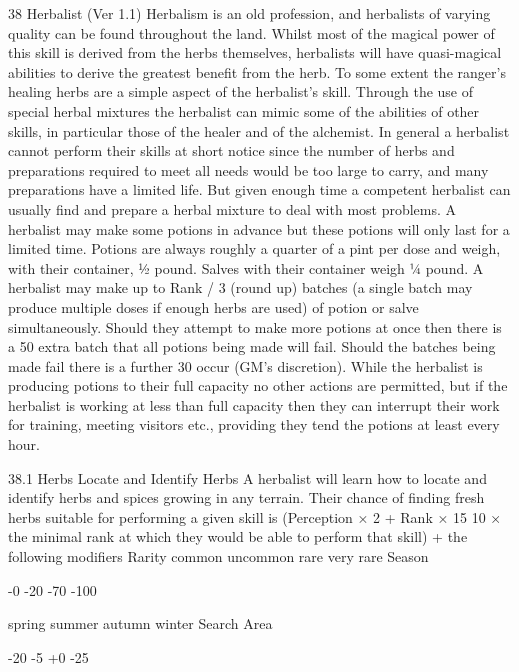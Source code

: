 \documentclass[a4paper]{article}
\begin{document}
\begin{multicols}{3}
38 Herbalist (Ver 1.1)
Herbalism is an old profession, and herbalists of
varying quality can be found throughout the land.
Whilst most of the magical power of this skill is
derived from the herbs themselves, herbalists will
have quasi-magical abilities to derive the greatest
benefit from the herb. To some extent the ranger’s
healing herbs are a simple aspect of the herbalist’s
skill. Through the use of special herbal mixtures
the herbalist can mimic some of the abilities of
other skills, in particular those of the healer and of
the alchemist. In general a herbalist cannot perform
their skills at short notice since the number of
herbs and preparations required to meet all needs
would be too large to carry, and many preparations
have a limited life. But given enough time a competent herbalist can usually find and prepare a
herbal mixture to deal with most problems.
A herbalist may make some potions in advance but
these potions will only last for a limited time.
Potions are always roughly a quarter of a pint per
dose and weigh, with their container, ½ pound.
Salves with their container weigh ¼ pound. A
herbalist may make up to Rank / 3 (round up)
batches (a single batch may produce multiple doses
if enough herbs are used) of potion or salve simultaneously. Should they attempt to make more potions at once then there is a 50%
extra batch that all potions being made will fail.
Should the batches being made fail there is a further 30%
occur (GM’s discretion). While the herbalist is
producing potions to their full capacity no other
actions are permitted, but if the herbalist is working at less than full capacity then they can interrupt
their work for training, meeting visitors etc., providing they tend the potions at least every hour.

38.1 Herbs
Locate and Identify Herbs
A herbalist will learn how to locate and identify
herbs and spices growing in any terrain. Their
chance of finding fresh herbs suitable for performing a given skill is (Perception × 2 + Rank × 15 10 × the minimal rank at which they would be able
to perform that skill) + the following modifiers
Rarity
common
uncommon
rare
very rare
Season

-0
-20
-70
-100

spring
summer
autumn
winter
Search Area

-20
-5
+0
-25


\end{multicols}
\end{document}
